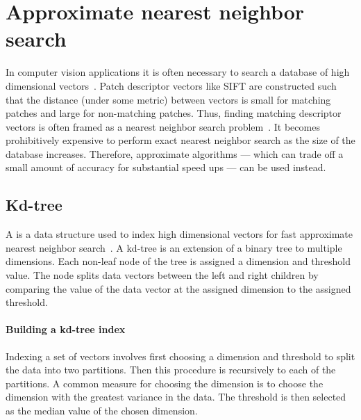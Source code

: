     \section{Approximate nearest neighbor search}\label{sec:ann}  

        In computer vision applications it is often necessary to search a database of high dimensional
        vectors~\cite{shakhnarovich_nearest_neighbor_2006, datar_locality_sensitive_2004, muja_fast_2009,
        kulis_kernelized_2012, weiss_spectral_2009}. Patch descriptor vectors like SIFT are constructed such that
        the distance (under some metric) between vectors is small for matching patches and large for non-matching
        patches. Thus, finding matching descriptor vectors is often framed as a nearest neighbor search
        problem~\cite{lowe_distinctive_2004}. It becomes prohibitively expensive to perform exact nearest neighbor
        search as the size of the database increases. Therefore, approximate algorithms --- which can trade off a
        small amount of accuracy for substantial speed ups --- can be used instead.

        \subsection{Kd-tree}

            A  is a data structure used to index high dimensional vectors for fast approximate
            nearest neighbor search~\cite{bentley_multidimensional_1975}. A kd-tree is an extension of a binary
            tree to multiple dimensions. Each non-leaf node of the tree is assigned a dimension and threshold
            value. The node splits data vectors between the left and right children by comparing the value of the
            data vector at the assigned dimension to the assigned threshold.

            \paragraph{Building a kd-tree index}
            Indexing a set of vectors involves first choosing a dimension and threshold to split the data into two
            partitions. Then this procedure is recursively to each of the partitions. A common measure for choosing
            the dimension is to choose the dimension with the greatest variance in the data. The threshold is then
            selected as the median value of the chosen dimension.

